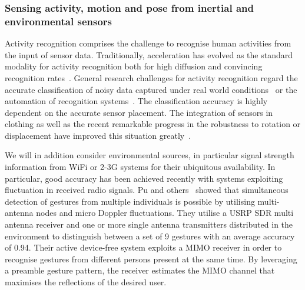 \documentclass[12pt]{article}
\begin{document}
\subsubsection*{Sensing activity, motion and pose from inertial and environmental sensors}
Activity recognition comprises the challenge to recognise human activities from the input of sensor data.
Traditionally, acceleration has evolved as the standard modality for activity recognition both for high diffusion and convincing recognition rates~\cite{Pervasive_Ravi_2005,Pervasive_Cao_2012}.
General research challenges for activity recognition regard the accurate classification of noisy data captured under real world conditions~\cite{Pervasive_Bao_2004} or the automation of recognition systems~\cite{Pervasive_Ploetz_2012}.
The classification accuracy is highly dependent on the accurate sensor placement.
The integration of sensors in clothing as well as the recent remarkable progress in the robustness to rotation or displacement have improved this situation greatly~\cite{Pevasive_Chavarriaga_2011}.

We will in addition consider environmental sources, in particular signal strength information from WiFi or 2-3G systems for their ubiquitous availability. 
In particular, good accuracy has been achieved recently with systems exploiting fluctuation in received radio signals. 
Pu and others~\cite{RFsensing_Pu_2013,RFsensing_Kim_2009} showed that simultaneous detection of gestures from multiple individuals is possible by utilising multi-antenna nodes and micro Doppler fluctuations.
They utilise a USRP SDR multi antenna receiver and one or more single antenna transmitters distributed in the environment to distinguish between a set of 9 gestures with an average accuracy of 0.94. 
Their active device-free system exploits a MIMO receiver in order to recognise gestures from different persons present at the same time. 
By leveraging a preamble gesture pattern, the receiver estimates the MIMO channel that maximises the reflections of the desired user.
\end{document}
